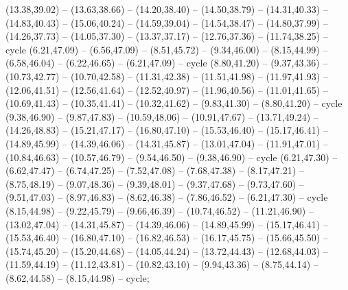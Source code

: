 {(13.38,39.02) -- (13.63,38.66) -- (14.20,38.40) -- (14.50,38.79) -- (14.31,40.33) -- (14.83,40.43) -- (15.06,40.24) -- (14.59,39.04) -- (14.54,38.47) -- (14.80,37.99) -- (14.26,37.73) -- (14.05,37.30) -- (13.37,37.17) -- (12.76,37.36) -- (11.74,38.25) -- cycle (6.21,47.09) -- (6.56,47.09) -- (8.51,45.72) -- (9.34,46.00) -- (8.15,44.99) -- (6.58,46.04) -- (6.22,46.65) -- (6.21,47.09) -- cycle (8.80,41.20) -- (9.37,43.36) -- (10.73,42.77) -- (10.70,42.58) -- (11.31,42.38) -- (11.51,41.98) -- (11.97,41.93) -- (12.06,41.51) -- (12.56,41.64) -- (12.52,40.97) -- (11.96,40.56) -- (11.01,41.65) -- (10.69,41.43) -- (10.35,41.41) -- (10.32,41.62) -- (9.83,41.30) -- (8.80,41.20) -- cycle (9.38,46.90) -- (9.87,47.83) -- (10.59,48.06) -- (10.91,47.67) -- (13.71,49.24) -- (14.26,48.83) -- (15.21,47.17) -- (16.80,47.10) -- (15.53,46.40) -- (15.17,46.41) -- (14.89,45.99) -- (14.39,46.06) -- (14.31,45.87) -- (13.01,47.04) -- (11.91,47.01) -- (10.84,46.63) -- (10.57,46.79) -- (9.54,46.50) -- (9.38,46.90) -- cycle (6.21,47.30) -- (6.62,47.47) -- (6.74,47.25) -- (7.52,47.08) -- (7.68,47.38) -- (8.17,47.21) -- (8.75,48.19) -- (9.07,48.36) -- (9.39,48.01) -- (9.37,47.68) -- (9.73,47.60) -- (9.51,47.03) -- (8.97,46.83) -- (8.62,46.38) -- (7.86,46.52) -- (6.21,47.30) -- cycle (8.15,44.98) -- (9.22,45.79) -- (9.66,46.39) -- (10.74,46.52) -- (11.21,46.90) -- (13.02,47.04) -- (14.31,45.87) -- (14.39,46.06) -- (14.89,45.99) -- (15.17,46.41) -- (15.53,46.40) -- (16.80,47.10) -- (16.82,46.53) -- (16.17,45.75) -- (15.66,45.50) -- (15.74,45.20) -- (15.20,44.68) -- (14.05,44.24) -- (13.72,44.43) -- (12.68,44.03) -- (11.59,44.19) -- (11.12,43.81) -- (10.82,43.10) -- (9.94,43.36) -- (8.75,44.14) -- (8.62,44.58) -- (8.15,44.98) -- cycle;
}
\newcommand{\countstatus}{96 units, 52 below 2,000}
